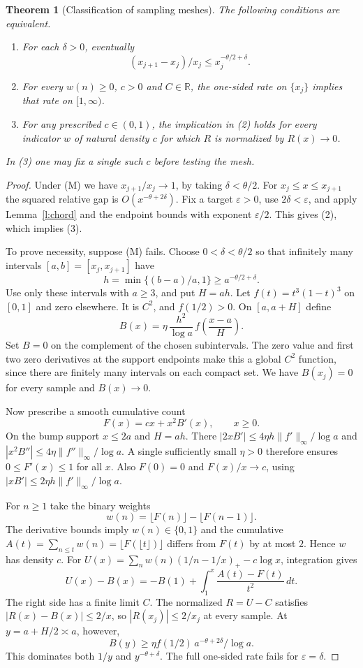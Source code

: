 \documentclass[11pt]{article}
\newtheorem{theorem}{Theorem}
\newcommand{\eps}{\varepsilon}
\newcommand{\R}{\mathbb{R}}
\begin{document}
\begin{theorem}[Classification of sampling meshes]\label{t:mesh}
The following conditions are equivalent.
\begin{enumerate}
\item For each $\delta>0$, eventually
\[
 (x_{j+1}-x_j)/x_j\le x_j^{-\theta/2+\delta}.
\tag{M}
\]
\item For every $w(n)\ge0$, $c>0$ and $C\in\R$, the one-sided rate on $\{x_j\}$ implies that rate on $[1,\infty)$.
\item For any prescribed $c\in(0,1)$, the implication in (2) holds for every indicator $w$ of natural density $c$ for which $R$ is normalized by $R(x)\to0$.
\end{enumerate}
In (3) one may fix a single such $c$ before testing the mesh.
\end{theorem}
\begin{proof}
Under (M) we have $x_{j+1}/x_j\to1$, by taking $\delta<\theta/2$. For $x_j\le x\le x_{j+1}$ the squared relative gap is $O(x^{-\theta+2\delta})$. Fix a target $\eps>0$, use $2\delta<\eps$, and apply Lemma~\ref{l:chord} and the endpoint bounds with exponent $\eps/2$. This gives (2), which implies (3).

To prove necessity, suppose (M) fails. Choose $0<\delta<\theta/2$ so that infinitely many intervals $[a,b]=[x_j,x_{j+1}]$ have
\[
 h=\min\{(b-a)/a,1\}\ge a^{-\theta/2+\delta}.
\]
Use only these intervals with $a\ge3$, and put $H=ah$. Let $f(t)=t^3(1-t)^3$ on $[0,1]$ and zero elsewhere. It is $C^2$, and $f(1/2)>0$. On $[a,a+H]$ define
\[
 B(x)=\eta\,\frac{h^2}{\log a}\,f\!\left(\frac{x-a}{H}\right).
\]
Set $B=0$ on the complement of the chosen subintervals. The zero value and first two zero derivatives at the support endpoints make this a global $C^2$ function, since there are finitely many intervals on each compact set. We have $B(x_j)=0$ for every sample and $B(x)\to0$.

Now prescribe a smooth cumulative count
\[
 F(x)=cx+x^2B'(x),\qquad x\ge0.
\]
On the bump support $x\le2a$ and $H=ah$. There $|2xB'|\le 4\eta h\|f'\|_\infty/\log a$ and $|x^2B''|\le4\eta\|f''\|_\infty/\log a$. A single sufficiently small $\eta>0$ therefore ensures $0\le F'(x)\le1$ for all $x$. Also $F(0)=0$ and $F(x)/x\to c$, using $|xB'|\le2\eta h\|f'\|_\infty/\log a$.

For $n\ge1$ take the binary weights
\[
 w(n)=\lfloor F(n)\rfloor-\lfloor F(n-1)\rfloor.
\]
The derivative bounds imply $w(n)\in\{0,1\}$ and the cumulative $A(t)=\sum_{n\le t}w(n)=\lfloor F(\lfloor t\rfloor)\rfloor$ differs from $F(t)$ by at most $2$. Hence $w$ has density $c$. For $U(x)=\sum_n w(n)(1/n-1/x)_+-c\log x$, integration gives
\[
 U(x)-B(x)=-B(1)+\int_1^x\frac{A(t)-F(t)}{t^2}\,dt .
\]
The right side has a finite limit $C$. The normalized $R=U-C$ satisfies $|R(x)-B(x)|\le2/x$, so $|R(x_j)|\le2/x_j$ at every sample. At $y=a+H/2\asymp a$, however,
\[
 B(y)\ge \eta f(1/2)\,a^{-\theta+2\delta}/\log a .
\]
This dominates both $1/y$ and $y^{-\theta+\delta}$. The full one-sided rate fails for $\eps=\delta$.
\end{proof}
\end{document}
